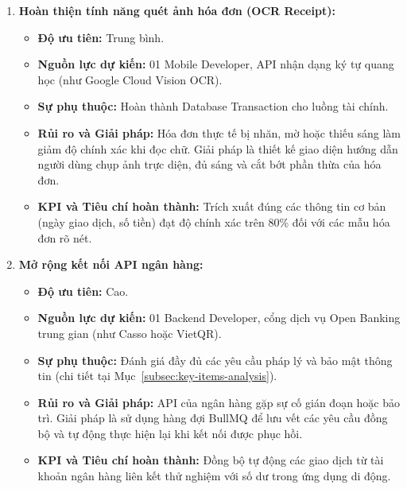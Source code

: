 \begin{enumerate}
    \item \textbf{Hoàn thiện tính năng quét ảnh hóa đơn (OCR Receipt):}
    \begin{itemize}
        \item \textbf{Độ ưu tiên:} Trung bình.
        \item \textbf{Nguồn lực dự kiến:} 01 Mobile Developer, API nhận dạng ký tự quang học (như Google Cloud Vision OCR).
        \item \textbf{Sự phụ thuộc:} Hoàn thành Database Transaction cho luồng tài chính.
        \item \textbf{Rủi ro và Giải pháp:} Hóa đơn thực tế bị nhăn, mờ hoặc thiếu sáng làm giảm độ chính xác khi đọc chữ. Giải pháp là thiết kế giao diện hướng dẫn người dùng chụp ảnh trực diện, đủ sáng và cắt bớt phần thừa của hóa đơn.
        \item \textbf{KPI và Tiêu chí hoàn thành:} Trích xuất đúng các thông tin cơ bản (ngày giao dịch, số tiền) đạt độ chính xác trên 80\% đối với các mẫu hóa đơn rõ nét.
    \end{itemize}

    \item \textbf{Mở rộng kết nối API ngân hàng:}
    \begin{itemize}
        \item \textbf{Độ ưu tiên:} Cao.
        \item \textbf{Nguồn lực dự kiến:} 01 Backend Developer, cổng dịch vụ Open Banking trung gian (như Casso hoặc VietQR).
        \item \textbf{Sự phụ thuộc:} Đánh giá đầy đủ các yêu cầu pháp lý và bảo mật thông tin (chi tiết tại Mục~\ref{subsec:key-items-analysis}).
        \item \textbf{Rủi ro và Giải pháp:} API của ngân hàng gặp sự cố gián đoạn hoặc bảo trì. Giải pháp là sử dụng hàng đợi BullMQ để lưu vết các yêu cầu đồng bộ và tự động thực hiện lại khi kết nối được phục hồi.
        \item \textbf{KPI và Tiêu chí hoàn thành:} Đồng bộ tự động các giao dịch từ tài khoản ngân hàng liên kết thử nghiệm với số dư trong ứng dụng di động.
    \end{itemize}


\end{enumerate}
